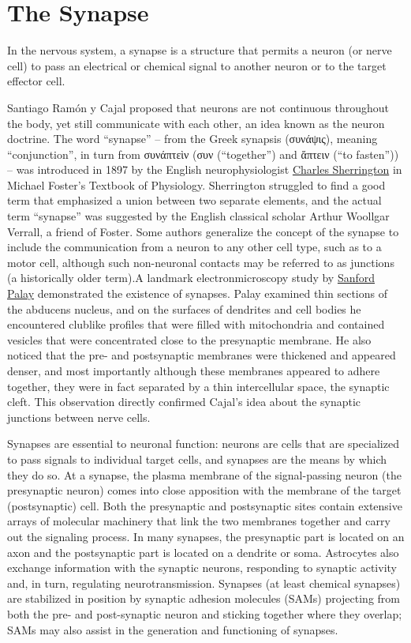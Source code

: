 \hypertarget{the-synapse}{%
\section{The Synapse}\label{the-synapse}}

In the nervous system, a synapse is a structure that permits a neuron (or nerve cell) to pass an electrical or chemical signal to another neuron or to the target effector cell.

Santiago Ramón y Cajal proposed that neurons are not continuous throughout the body, yet still communicate with each other, an idea known as the neuron doctrine. The word ``synapse'' -- from the Greek synapsis (συνάψις), meaning ``conjunction'', in turn from συνάπτεὶν (συν (``together'') and ἅπτειν (``to fasten'')) -- was introduced in 1897 by the English neurophysiologist \href{https://en.wikipedia.org/wiki/Charles_Scott_Sherrington}{Charles Sherrington} in Michael Foster's Textbook of Physiology. Sherrington struggled to find a good term that emphasized a union between two separate elements, and the actual term ``synapse'' was suggested by the English classical scholar Arthur Woollgar Verrall, a friend of Foster. Some authors generalize the concept of the synapse to include the communication from a neuron to any other cell type, such as to a motor cell, although such non-neuronal contacts may be referred to as junctions (a historically older term).A landmark electronmicroscopy study by \href{https://en.wikipedia.org/wiki/Sanford_Palay}{Sanford Palay} demonstrated the existence of synapses. Palay examined thin sections of the abducens nucleus, and on the surfaces of dendrites and cell bodies he encountered clublike profiles that were filled with mitochondria and contained vesicles that were concentrated close to the presynaptic membrane. He also noticed that the pre- and postsynaptic membranes were thickened and appeared denser, and most importantly although these membranes appeared to adhere together, they were in fact separated by a thin intercellular space, the synaptic cleft. This observation directly confirmed Cajal's idea about the synaptic junctions between nerve cells.

Synapses are essential to neuronal function: neurons are cells that are specialized to pass signals to individual target cells, and synapses are the means by which they do so. At a synapse, the plasma membrane of the signal-passing neuron (the presynaptic neuron) comes into close apposition with the membrane of the target (postsynaptic) cell. Both the presynaptic and postsynaptic sites contain extensive arrays of molecular machinery that link the two membranes together and carry out the signaling process. In many synapses, the presynaptic part is located on an axon and the postsynaptic part is located on a dendrite or soma. Astrocytes also exchange information with the synaptic neurons, responding to synaptic activity and, in turn, regulating neurotransmission. Synapses (at least chemical synapses) are stabilized in position by synaptic adhesion molecules (SAMs) projecting from both the pre- and post-synaptic neuron and sticking together where they overlap; SAMs may also assist in the generation and functioning of synapses.

